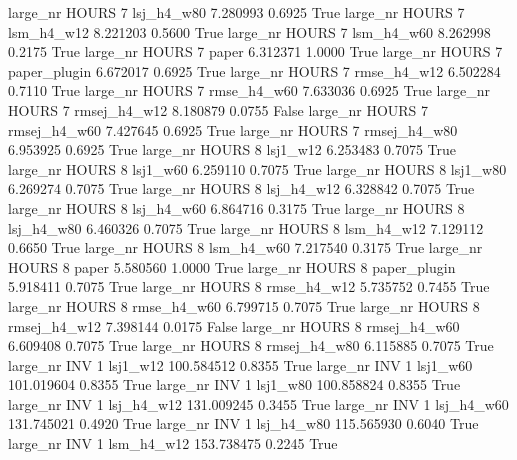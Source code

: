   large_nr    HOURS                 7   lsj_h4_w80    7.280993      0.6925    True
  large_nr    HOURS                 7   lsm_h4_w12    8.221203      0.5600    True
  large_nr    HOURS                 7   lsm_h4_w60    8.262998      0.2175    True
  large_nr    HOURS                 7        paper    6.312371      1.0000    True
  large_nr    HOURS                 7 paper_plugin    6.672017      0.6925    True
  large_nr    HOURS                 7  rmse_h4_w12    6.502284      0.7110    True
  large_nr    HOURS                 7  rmse_h4_w60    7.633036      0.6925    True
  large_nr    HOURS                 7 rmsej_h4_w12    8.180879      0.0755   False
  large_nr    HOURS                 7 rmsej_h4_w60    7.427645      0.6925    True
  large_nr    HOURS                 7 rmsej_h4_w80    6.953925      0.6925    True
  large_nr    HOURS                 8     lsj1_w12    6.253483      0.7075    True
  large_nr    HOURS                 8     lsj1_w60    6.259110      0.7075    True
  large_nr    HOURS                 8     lsj1_w80    6.269274      0.7075    True
  large_nr    HOURS                 8   lsj_h4_w12    6.328842      0.7075    True
  large_nr    HOURS                 8   lsj_h4_w60    6.864716      0.3175    True
  large_nr    HOURS                 8   lsj_h4_w80    6.460326      0.7075    True
  large_nr    HOURS                 8   lsm_h4_w12    7.129112      0.6650    True
  large_nr    HOURS                 8   lsm_h4_w60    7.217540      0.3175    True
  large_nr    HOURS                 8        paper    5.580560      1.0000    True
  large_nr    HOURS                 8 paper_plugin    5.918411      0.7075    True
  large_nr    HOURS                 8  rmse_h4_w12    5.735752      0.7455    True
  large_nr    HOURS                 8  rmse_h4_w60    6.799715      0.7075    True
  large_nr    HOURS                 8 rmsej_h4_w12    7.398144      0.0175   False
  large_nr    HOURS                 8 rmsej_h4_w60    6.609408      0.7075    True
  large_nr    HOURS                 8 rmsej_h4_w80    6.115885      0.7075    True
  large_nr      INV                 1     lsj1_w12  100.584512      0.8355    True
  large_nr      INV                 1     lsj1_w60  101.019604      0.8355    True
  large_nr      INV                 1     lsj1_w80  100.858824      0.8355    True
  large_nr      INV                 1   lsj_h4_w12  131.009245      0.3455    True
  large_nr      INV                 1   lsj_h4_w60  131.745021      0.4920    True
  large_nr      INV                 1   lsj_h4_w80  115.565930      0.6040    True
  large_nr      INV                 1   lsm_h4_w12  153.738475      0.2245    True
